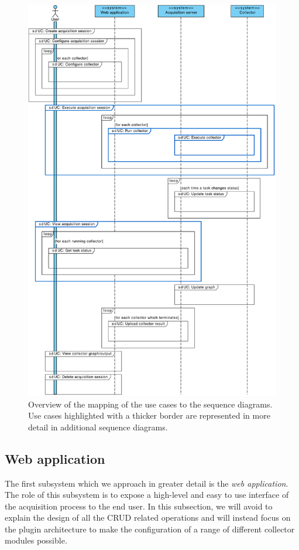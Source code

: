 \begin{figure}
  \centering
  \includegraphics[width=0.95\linewidth]{images/diagrams/seq-overview}
  \caption[Overview of the mapping of the use cases to the sequence diagrams.]{Overview of the mapping of the use cases to the sequence diagrams. Use cases highlighted with a thicker border are represented in more detail in additional sequence diagrams.}
  \label{fig:seq-overview}
\end{figure}


\subsection{Web application}

The first subsystem which we approach in greater detail is the \emph{web application}. The role of this subsystem is to expose a high-level and easy to use interface of the acquisition process to the end user. In this subsection, we will avoid to explain the design of all the CRUD related operations and will instead focus on the plugin architecture to make the configuration of a range of different collector modules possible.


